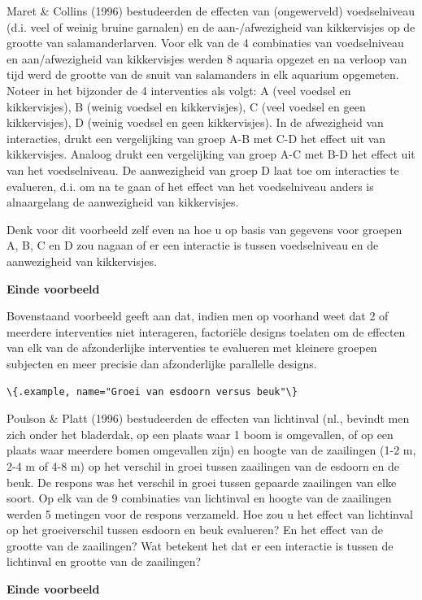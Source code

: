 \documentclass[
  12pt,dutch,coursenotes]{book}
\newcommand{\passthrough}[1]{#1}
\begin{document}
Maret \& Collins (1996) bestudeerden de effecten van (ongewerveld) voedselniveau (d.i. veel of weinig bruine garnalen) en de aan-/afwezigheid van kikkervisjes op de grootte van salamanderlarven. Voor elk van de 4 combinaties van voedselniveau en aan/afwezigheid van kikkervisjes werden 8 aquaria opgezet en na verloop van tijd werd de grootte van de snuit van salamanders in elk aquarium opgemeten. Noteer in het bijzonder de 4 interventies als volgt: A (veel voedsel en kikkervisjes), B (weinig voedsel en kikkervisjes), C (veel voedsel en geen kikkervisjes), D (weinig voedsel en geen kikkervisjes).
In de afwezigheid van interacties, drukt een vergelijking van groep A-B met C-D het effect uit
van kikkervisjes. Analoog drukt een vergelijking van groep A-C met B-D
het effect uit van het voedselniveau. De aanwezigheid van groep D laat toe om
interacties te evalueren, d.i. om na te gaan of het effect van het voedselniveau anders is alnaargelang de aanwezigheid van kikkervisjes.

Denk voor dit voorbeeld zelf even na hoe u op basis van gegevens voor
groepen A, B, C en D zou nagaan of er een interactie is tussen voedselniveau en
de aanwezigheid van kikkervisjes.

\textbf{Einde voorbeeld}

Bovenstaand voorbeeld geeft aan dat, indien men op voorhand weet dat 2 of meerdere interventies niet
interageren, factoriële designs toelaten om de effecten van elk van de
afzonderlijke interventies te evalueren met kleinere groepen subjecten en
meer precisie dan afzonderlijke parallelle designs.

\passthrough{\lstinline!\{.example, name="Groei van esdoorn versus beuk"\}!}

Poulson \& Platt (1996) bestudeerden de effecten van lichtinval (nl., bevindt men zich onder het bladerdak, op een plaats waar 1 boom is omgevallen, of op een plaats waar meerdere bomen omgevallen zijn) en hoogte van de zaailingen (1-2 m, 2-4 m of 4-8 m) op het verschil in groei tussen zaailingen van de esdoorn en de beuk. De respons was het verschil in groei tussen gepaarde zaailingen van elke soort. Op elk van de 9 combinaties van lichtinval en hoogte van de zaailingen werden 5 metingen voor de respons verzameld. Hoe zou
u het effect van lichtinval op het groeiverschil tussen esdoorn en beuk evalueren?
En het effect van de grootte van de zaailingen? Wat betekent het dat er een
interactie is tussen de lichtinval en grootte van de zaailingen?

\textbf{Einde voorbeeld}
\end{document}
